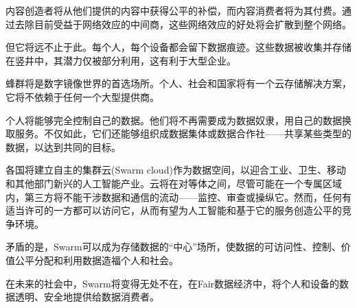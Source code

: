 内容创造者将从他们提供的内容中获得公平的补偿，而内容消费者将为其付费。通过去除目前受益于网络效应的中间商，这些网络效应的好处将会扩散到整个网络。

但它将远不止于此。每个人，每个设备都会留下数据痕迹。这些数据被收集并存储在竖井中，其潜力仅被部分利用，这有利于大型企业。

蜂群将是数字镜像世界的首选场所。个人、社会和国家将有一个云存储解决方案，它将不依赖于任何一个大型提供商。 


个人将能够完全控制自己的数据。他们将不再需要成为数据奴隶，用自己的数据换取服务。不仅如此，它们还能够组织成数据集体或数据合作社——共享某些类型的数据，以达到共同的目标。 

各国将建立自主的集群云(Swarm cloud)作为数据空间，以迎合工业、卫生、移动和其他部门新兴的人工智能产业。云将在对等体之间，尽管可能在一个专属区域内，第三方将不能干涉数据和通信的流动——监控、审查或操纵它。然而，任何有适当许可的一方都可以访问它，从而有望为人工智能和基于它的服务创造公平的竞争环境。  

矛盾的是，Swarm可以成为存储数据的“中心”场所，使数据的可访问性、控制、价值公平分配和利用数据造福个人和社会。

在未来的社会中，Swarm将变得无处不在，在Fair数据经济中，将个人和设备的数据透明、安全地提供给数据消费者。


